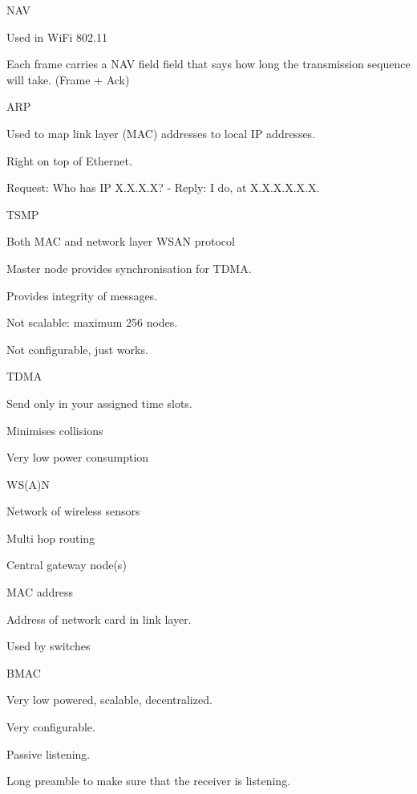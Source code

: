 \documentclass[main.tex]{subfiles}
\begin{document}
\begin{card}{NAV}
\item Used in WiFi 802.11
\item Each frame carries a NAV field field that says how long the transmission sequence will take. (Frame + Ack)
\end{card}

\begin{card}{ARP}
\item Used to map link layer (MAC) addresses to local IP addresses.
\item Right on top of Ethernet.
\item Request: Who has IP X.X.X.X? - Reply: I do, at X.X.X.X.X.X.
\end{card}

\begin{card}{TSMP}
\item Both MAC and network layer WSAN protocol
\item Master node provides synchronisation for TDMA.
\item Provides integrity of messages.
\item Not scalable: maximum 256 nodes.
\item Not configurable, just works.
\end{card}

\begin{card}{TDMA}
\item Send only in your assigned time slots.
\item Minimises collisions
\item Very low power consumption
\end{card}

\begin{card}{WS(A)N}
\item Network of wireless sensors
\item Multi hop routing
\item Central gateway node(s)
\end{card}

\begin{card}{MAC address}
\item Address of network card in link layer.
\item Used by switches
\end{card}

\begin{card}{BMAC}
\item Very low powered, scalable, decentralized.
\item Very configurable.
\item Passive listening.
\item Long preamble to make sure that the receiver is listening.
\end{card}
\end{document}
